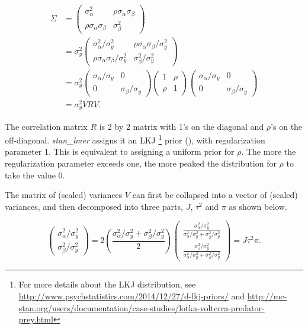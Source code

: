 \begin{align}
\Sigma &= 
\left(\begin{matrix} 
\sigma_\alpha^2 & \rho\sigma_\alpha \sigma_\beta \\ 
\rho\sigma_\alpha\sigma_\beta&\sigma_\beta^2 
\end{matrix} \right)\\ &= 
\sigma_y^2\left(\begin{matrix} 
\sigma_\alpha^2/\sigma_y^2 & \rho\sigma_\alpha \sigma_\beta/\sigma_y^2 \\ 
\rho\sigma_\alpha\sigma_\beta/\sigma_y^2 & \sigma_\beta^2/\sigma_y^2 
\end{matrix} \right)\\ &= 
\sigma_y^2\left(\begin{matrix} 
\sigma_\alpha/\sigma_y & 0 \\ 
0&\sigma_\beta/\sigma_y
\end{matrix} \right)
\left(\begin{matrix} 
1 & \rho\\ 
\rho&1 
\end{matrix} \right)
\left(\begin{matrix} 
\sigma_\alpha/\sigma_y & 0 \\ 
0&\sigma_\beta/\sigma_y 
\end{matrix} \right)\\ 
&= \sigma_y^2VRV.
\end{align}


The correlation matrix $R$ is 2 by 2 matrix with 1's on the diagonal and $\rho$'s on the off-diagonal. \textit{stan\_lmer} assigns it an LKJ \footnote{For more details about the LKJ distribution, see \url{http://www.psychstatistics.com/2014/12/27/d-lkj-priors/} and \url{http://mc-stan.org/users/documentation/case-studies/lotka-volterra-predator-prey.html}} prior (\cite{lewandowski2009generating}), with regularization parameter 1.  This is equivalent to assigning a uniform prior for $\rho$.  The more the regularization parameter exceeds one, the more peaked the distribution for $\rho$ to take the value 0.  

The matrix of (scaled) variances $V$ can first be collapsed into a vector of (scaled) variances, and then decomposed into three parts, $J$, $\tau^2$ and $\pi$ as shown below. 

$$
\left(\begin{matrix} 
\sigma_\alpha^2/\sigma_y^2 \\ 
\sigma_\beta^2/\sigma_y^2 
\end{matrix} \right) = 
2\left(\frac{\sigma_\alpha^2/\sigma_y^2 + \sigma_\beta^2/\sigma_y^2}{2}\right)\left(\begin{matrix} 
\frac{\sigma_\alpha^2/\sigma_y^2}{\sigma_\alpha^2/\sigma_y^2 + \sigma_\beta^2/\sigma_y^2} \\ 
\frac{\sigma_\beta^2/\sigma_y^2}{\sigma_\alpha^2/\sigma_y^2 + \sigma_\beta^2/\sigma_y^2} 
\end{matrix} \right)=
J\tau^2 \pi. 
$$  

